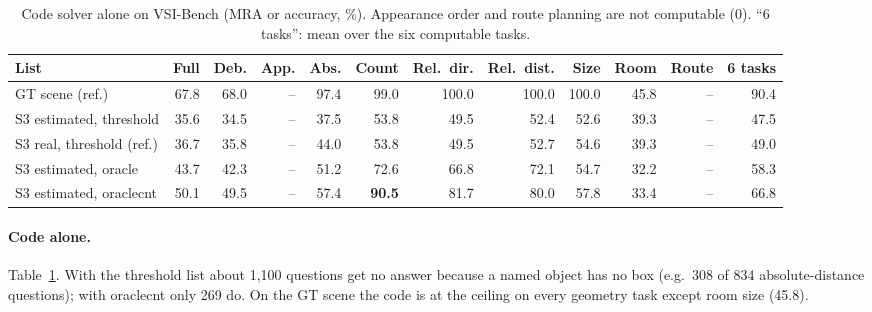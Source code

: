 \begin{table}[h]
\centering
\caption{Code solver alone on VSI-Bench (MRA or accuracy, \%). Appearance order and route planning are not computable
(0). ``6 tasks'': mean over the six computable tasks.}
\label{tab:agent-code}
\small
\setlength{\tabcolsep}{4pt}
\begin{tabular}{lrrrrrrrrrrr}
\toprule
List & Full & Deb. & App. & Abs. & Count & Rel.\ dir. & Rel.\ dist. & Size & Room & Route & 6 tasks \\
\midrule
GT scene (ref.)                 & 67.8 & 68.0 & -- & 97.4 & 99.0 & 100.0 & 100.0 & 100.0 & 45.8 & -- & 90.4 \\
S3 estimated, threshold         & 35.6 & 34.5 & -- & 37.5 & 53.8 & 49.5 & 52.4 & 52.6 & 39.3 & -- & 47.5 \\
S3 real, threshold (ref.)       & 36.7 & 35.8 & -- & 44.0 & 53.8 & 49.5 & 52.7 & 54.6 & 39.3 & -- & 49.0 \\
S3 estimated, oracle            & 43.7 & 42.3 & -- & 51.2 & 72.6 & 66.8 & 72.1 & 54.7 & 32.2 & -- & 58.3 \\
S3 estimated, oraclecnt         & 50.1 & 49.5 & -- & 57.4 & \textbf{90.5} & 81.7 & 80.0 & 57.8 & 33.4 & -- & 66.8 \\
\bottomrule
\end{tabular}
\end{table}

\paragraph{Code alone.}
Table~\ref{tab:agent-code}. With the threshold list about 1,100 questions get no answer because a named object has no
box (e.g.\ 308 of 834 absolute-distance questions); with oraclecnt only 269 do. On the GT scene the code is at the ceiling
on every geometry task except room size (45.8).

